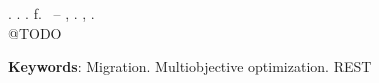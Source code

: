 \begin{resumo}[ABSTRACT]
\begin{SingleSpacing}

\imprimirautorcitacao. \imprimirtitleabstract. \imprimirdata. \pageref {LastPage} f. \imprimirprojeto\ – \imprimirprograma, \imprimirinstituicao. \imprimirlocal, \imprimirdata.\\

@TODO

\textbf{Keywords}: Migration. Multiobjective optimization. REST 

\end{SingleSpacing}
\end{resumo}
